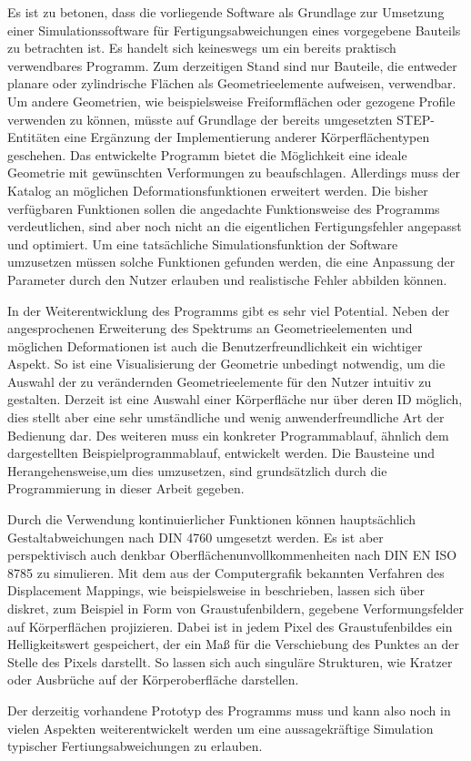 Es ist zu betonen, dass die vorliegende Software als Grundlage zur Umsetzung einer Simulationssoftware für Fertigungsabweichungen eines vorgegebene Bauteils zu betrachten ist. Es handelt sich keineswegs um ein bereits praktisch verwendbares Programm.   
Zum derzeitigen Stand sind nur Bauteile, die entweder planare  oder zylindrische Flächen als Geometrieelemente aufweisen, verwendbar. Um andere Geometrien, wie beispielsweise Freiformflächen oder gezogene Profile verwenden zu können, müsste auf Grundlage der bereits umgesetzten STEP-Entitäten eine Ergänzung der Implementierung anderer Körperflächentypen geschehen. 
Das entwickelte Programm bietet die Möglichkeit eine ideale Geometrie mit gewünschten Verformungen zu beaufschlagen. Allerdings muss der Katalog an möglichen Deformationsfunktionen erweitert werden. Die bisher verfügbaren Funktionen sollen die angedachte Funktionsweise des Programms verdeutlichen, sind aber noch nicht an die eigentlichen Fertigungsfehler angepasst und optimiert. Um eine tatsächliche Simulationsfunktion der Software umzusetzen müssen solche Funktionen gefunden werden, die eine Anpassung der Parameter durch den Nutzer erlauben und realistische Fehler abbilden können. 

In der Weiterentwicklung des Programms gibt es sehr viel Potential. Neben der angesprochenen Erweiterung des Spektrums an Geometrieelementen und möglichen Deformationen ist auch die Benutzerfreundlichkeit ein wichtiger Aspekt. So ist eine Visualisierung der Geometrie unbedingt notwendig, um die Auswahl der zu verändernden Geometrieelemente für den Nutzer intuitiv zu gestalten. Derzeit ist eine Auswahl einer Körperfläche nur über deren ID möglich, dies stellt aber eine sehr umständliche und wenig anwenderfreundliche Art der Bedienung dar. Des weiteren muss ein konkreter Programmablauf, ähnlich dem dargestellten Beispielprogrammablauf, entwickelt werden. Die Bausteine und Herangehensweise,um dies umzusetzen, sind grundsätzlich durch die Programmierung in dieser Arbeit gegeben.    

Durch die Verwendung kontinuierlicher Funktionen können hauptsächlich Gestaltabweichungen nach DIN 4760 \cite{DIN.4760} umgesetzt werden. Es ist aber perspektivisch auch denkbar Oberflächenunvollkommenheiten nach DIN EN ISO 8785 \cite{DIN.8785} zu simulieren. Mit dem aus der Computergrafik bekannten Verfahren des Displacement Mappings, wie beispielsweise in \cite{Kalos.2008} beschrieben, lassen sich über diskret, zum Beispiel in Form von Graustufenbildern, gegebene Verformungsfelder auf Körperflächen projizieren. Dabei ist in jedem Pixel des Graustufenbildes ein Helligkeitswert gespeichert, der ein Maß für die Verschiebung des Punktes an der Stelle des Pixels darstellt. So lassen sich auch singuläre Strukturen, wie Kratzer oder Ausbrüche auf der Körperoberfläche darstellen. 

Der derzeitig vorhandene Prototyp des Programms muss und kann also noch in vielen Aspekten weiterentwickelt werden um eine aussagekräftige Simulation typischer Fertiungsabweichungen zu erlauben.    

      



          